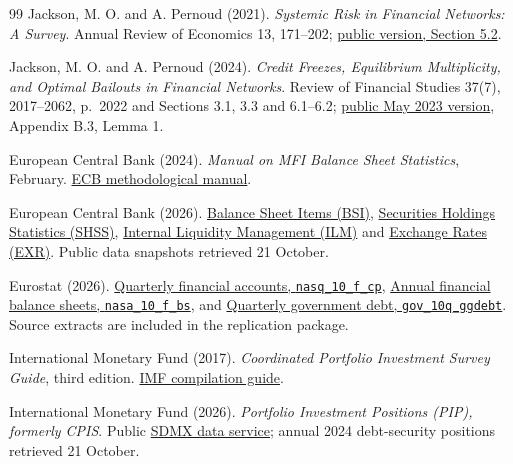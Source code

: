\begingroup
\small
\begin{thebibliography}{99}
Jackson, M. O. and A. Pernoud (2021). \emph{Systemic Risk in Financial Networks: A Survey}. Annual Review of Economics 13, 171--202; \href{https://arxiv.org/html/2012.12702}{public version, Section 5.2}.

Jackson, M. O. and A. Pernoud (2024). \emph{Credit Freezes, Equilibrium Multiplicity, and Optimal Bailouts in Financial Networks}. Review of Financial Studies 37(7), 2017--2062, p.~2022 and Sections 3.1, 3.3 and 6.1--6.2; \href{https://arxiv.org/html/2012.12861}{public May 2023 version}, Appendix B.3, Lemma 1.

European Central Bank (2024). \emph{Manual on MFI Balance Sheet Statistics}, February. \href{https://www.ecb.europa.eu/pub/pdf/other/ecb.manualmfibalancesheetstatistics202402~8e4fc2ccca.en.pdf}{ECB methodological manual}.

European Central Bank (2026). \href{https://data.ecb.europa.eu/data/datasets/BSI}{Balance Sheet Items (BSI)}, \href{https://data.ecb.europa.eu/data/datasets/SHSS}{Securities Holdings Statistics (SHSS)}, \href{https://data.ecb.europa.eu/data/datasets/ILM/data-information}{Internal Liquidity Management (ILM)} and \href{https://data.ecb.europa.eu/data/datasets/EXR}{Exchange Rates (EXR)}. Public data snapshots retrieved 21 October.

Eurostat (2026). \href{https://ec.europa.eu/eurostat/databrowser/view/nasq_10_f_cp/default/table}{Quarterly financial accounts, \texttt{nasq\_10\_f\_cp}}, \href{https://ec.europa.eu/eurostat/databrowser/view/nasa_10_f_bs/default/table}{Annual financial balance sheets, \texttt{nasa\_10\_f\_bs}}, and \href{https://ec.europa.eu/eurostat/databrowser/view/gov_10q_ggdebt/default/table}{Quarterly government debt, \texttt{gov\_10q\_ggdebt}}. Source extracts are included in the replication package.

International Monetary Fund (2017). \emph{Coordinated Portfolio Investment Survey Guide}, third edition. \href{https://data.imf.org/-/media/iData/External-Storage/Documents/390C683A8FA24B58B7EBBBB33B82AD3B/en/CPIS-Guide-Third-Edition.pdf}{IMF compilation guide}.

International Monetary Fund (2026). \emph{Portfolio Investment Positions (PIP), formerly CPIS}. Public \href{https://api.imf.org/external/sdmx/3.0/}{SDMX data service}; annual 2024 debt-security positions retrieved 21 October.


\end{thebibliography}
